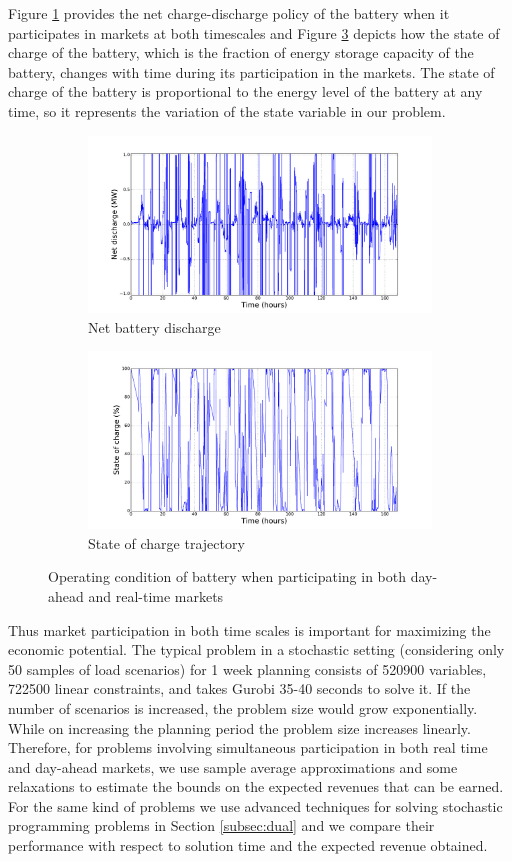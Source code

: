 \documentclass[11pt,twoside]{article}
\begin{document}
Figure \ref{fig:netpower_fp_st} provides the net charge-discharge policy of the battery when it participates in markets at both timescales and Figure \ref{fig:soc_fp_st} depicts how the state of charge of the battery, which is the fraction of energy storage capacity of the battery, changes with time during its participation in the markets. The state of charge of the battery is proportional to the energy level of the battery at any time, so it represents the variation of the state variable in our problem.
\begin{figure}[h!]
\begin{subfigure}{\textwidth}
\centering
\includegraphics[width=0.7\linewidth]{Figures/Plots/fullproblem_stoch/netpower_fp_st.pdf} \caption{Net battery discharge}\label{fig:netpower_fp_st}
\end{subfigure}
\begin{subfigure}{\textwidth}
\centering
\includegraphics[width=0.7\linewidth]{Figures/Plots/fullproblem_stoch/soc_fp_st.pdf} \caption{State of charge trajectory}\label{fig:soc_fp_st}
\end{subfigure}
\caption{Operating condition of battery when participating in both day-ahead and real-time markets}
\end{figure}
\FloatBarrier

Thus market participation in both time scales is important for maximizing the economic potential. The typical problem in a stochastic setting (considering only 50 samples of load scenarios) for 1 week planning consists of 520900 variables, 722500 linear constraints, and takes Gurobi 35-40 seconds to solve it. 
If the number of scenarios is increased, the problem size would grow exponentially. While on increasing the planning period the problem size increases linearly. Therefore, for problems involving simultaneous participation in both real time and day-ahead markets, we use sample average approximations and some relaxations to estimate the bounds on the expected revenues that can be earned. For the same kind of problems we use advanced techniques for solving stochastic programming problems in Section \ref{subsec:dual} and we compare their performance with respect to solution time and the expected revenue obtained.
\end{document}
